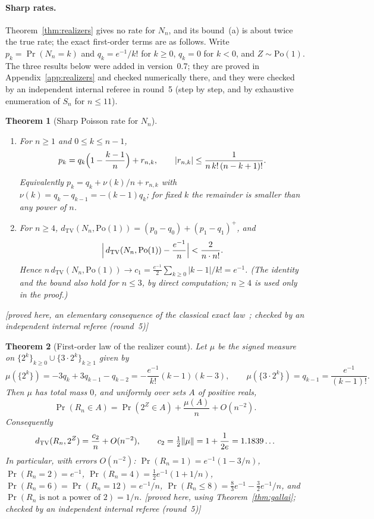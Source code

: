 \documentclass[11pt,a4paper]{article}
\theoremstyle{plain}
\newtheorem{theorem}{Theorem}[section]
\theoremstyle{definition}
\theoremstyle{remark}
\newcommand{\status}[1]{\textsf{\small [#1]}}
\begin{document}
\paragraph{Sharp rates.}
Theorem~\ref{thm:realizers} gives no rate for $N_n$, and its bound~(a) is about twice the true rate; the exact first-order terms are as follows. Write $p_k=\Pr(N_n=k)$ and $q_k=e^{-1}/k!$ for $k\ge0$, $q_k=0$ for $k<0$, and $Z\sim\mathrm{Po}(1)$. The three results below were added in version~0.7; they are proved in Appendix~\ref{app:realizers} and checked numerically there, and they were checked by an independent internal referee in round~5 (step by step, and by exhaustive enumeration of $S_n$ for $n\le11$).

\begin{theorem}[Sharp Poisson rate for $N_n$]\label{thm:sharpN}
\begin{enumerate}[label=(\roman*),leftmargin=2em]
\item For $n\ge1$ and $0\le k\le n-1$,
\[
p_k=q_k\Bigl(1-\frac{k-1}{n}\Bigr)+r_{n,k},\qquad |r_{n,k}|\le\frac{1}{n\,k!\,(n-k+1)!}.
\]
Equivalently $p_k=q_k+\nu(k)/n+r_{n,k}$ with $\nu(k)=q_k-q_{k-1}=-(k-1)q_k$; for fixed $k$ the remainder is smaller than any power of $n$.
\item For $n\ge4$, $d_{\mathrm{TV}}(N_n,\mathrm{Po}(1))=(p_0-q_0)+(p_1-q_1)^+$, and
\[
\Bigl|\,d_{\mathrm{TV}}(N_n,\mathrm{Po}(1))-\frac{e^{-1}}{n}\Bigr|<\frac{2}{n\cdot n!}.
\]
Hence $n\,d_{\mathrm{TV}}(N_n,\mathrm{Po}(1))\to c_1=\tfrac{e^{-1}}2\sum_{k\ge0}|k-1|/k!=e^{-1}$. (The identity and the bound also hold for $n\le3$, by direct computation; $n\ge4$ is used only in the proof.)
\end{enumerate}
\status{proved here, an elementary consequence of the classical exact law~\citep{kaplansky1945}; checked by an independent internal referee (round~5)}
\end{theorem}

\begin{theorem}[First-order law of the realizer count]\label{thm:sharpR}
Let $\mu$ be the signed measure on $\{2^k\}_{k\ge0}\cup\{3\cdot2^k\}_{k\ge1}$ given by
\[
\mu(\{2^k\})=-3q_k+3q_{k-1}-q_{k-2}=-\frac{e^{-1}}{k!}(k-1)(k-3),\qquad
\mu(\{3\cdot2^k\})=q_{k-1}=\frac{e^{-1}}{(k-1)!}.
\]
Then $\mu$ has total mass $0$, and uniformly over sets $A$ of positive reals,
\[
\Pr(R_n\in A)=\Pr(2^Z\in A)+\frac{\mu(A)}{n}+O(n^{-2}).
\]
Consequently
\[
d_{\mathrm{TV}}(R_n,2^Z)=\frac{c_2}{n}+O(n^{-2}),\qquad c_2=\tfrac12\lVert\mu\rVert=1+\frac1{2e}=1.1839\ldots
\]
In particular, with errors $O(n^{-2})$: $\Pr(R_n=1)=e^{-1}(1-3/n)$, $\Pr(R_n=2)=e^{-1}$, $\Pr(R_n=4)=\tfrac12e^{-1}(1+1/n)$, $\Pr(R_n=6)=\Pr(R_n=12)=e^{-1}/n$, $\Pr(R_n\le8)=\tfrac83e^{-1}-\tfrac32e^{-1}/n$, and $\Pr(R_n\text{ is not a power of }2)=1/n$. \status{proved here, using Theorem~\ref{thm:gallai}; checked by an independent internal referee (round~5)}
\end{theorem}
\end{document}
